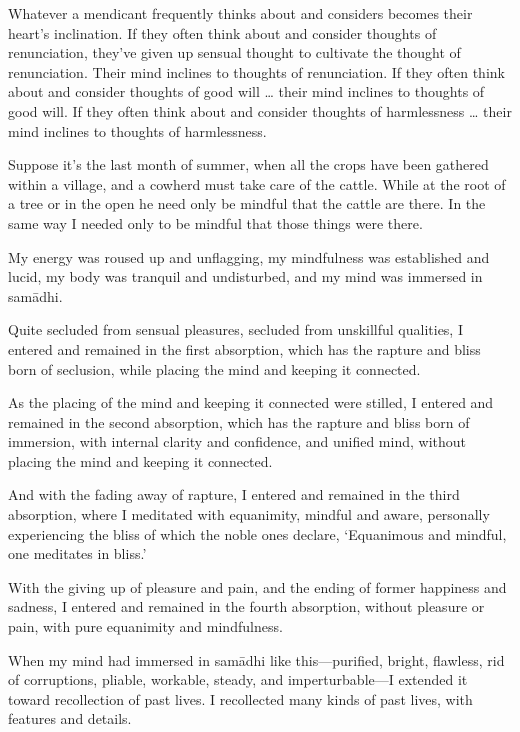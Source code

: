 \documentclass[12pt,openany]{book}%
\begin{document}
Whatever a mendicant frequently thinks about and considers becomes their heart’s inclination. If they often think about and consider thoughts of renunciation, they’ve given up sensual thought to cultivate the thought of renunciation. Their mind inclines to thoughts of renunciation. If they often think about and consider thoughts of good will … their mind inclines to thoughts of good will. If they often think about and consider thoughts of harmlessness … their mind inclines to thoughts of harmlessness. 

Suppose it’s the last month of summer, when all the crops have been gathered within a village, and a cowherd must take care of the cattle. While at the root of a tree or in the open he need only be mindful that the cattle are there. In the same way I needed only to be mindful that those things were there. 

My energy was roused up and unflagging, my mindfulness was established and lucid, my body was tranquil and undisturbed, and my mind was immersed in \textsanskrit{samādhi}. 

Quite secluded from sensual pleasures, secluded from unskillful qualities, I entered and remained in the first absorption, which has the rapture and bliss born of seclusion, while placing the mind and keeping it connected. 

As the placing of the mind and keeping it connected were stilled, I entered and remained in the second absorption, which has the rapture and bliss born of immersion, with internal clarity and confidence, and unified mind, without placing the mind and keeping it connected. 

And with the fading away of rapture, I entered and remained in the third absorption, where I meditated with equanimity, mindful and aware, personally experiencing the bliss of which the noble ones declare, ‘Equanimous and mindful, one meditates in bliss.’ 

With the giving up of pleasure and pain, and the ending of former happiness and sadness, I entered and remained in the fourth absorption, without pleasure or pain, with pure equanimity and mindfulness. 

When my mind had immersed in \textsanskrit{samādhi} like this—purified, bright, flawless, rid of corruptions, pliable, workable, steady, and imperturbable—I extended it toward recollection of past lives. I recollected many kinds of past lives, with features and details. 
\end{document}
